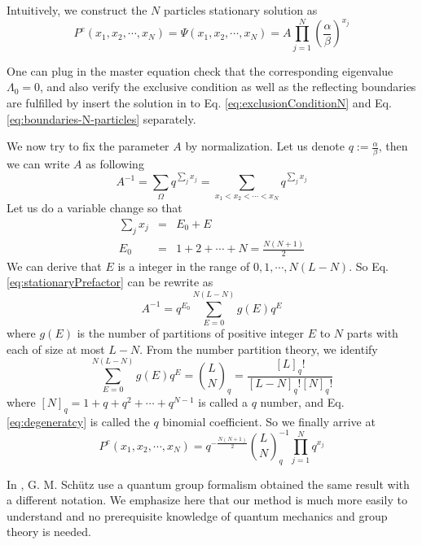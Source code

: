Intuitively, we construct the $N$ particles stationary solution as
\begin{equation}
    \label{eq:stationaryN}
    P^e(x_1, x_2, \cdots, x_N) = \Psi(x_1, x_2, \cdots, x_N) =  A
    \prod_{j=1}^N\left(\frac{\alpha}{\beta}\right)^{x_j}
\end{equation}

One can plug in the master equation check that the corresponding eigenvalue
$\Lambda_0= 0$, and also verify the exclusive condition as well as the reflecting
boundaries are fulfilled by insert the solution in to Eq.
\eqref{eq:exclusionConditionN} and Eq. \eqref{eq:boundaries-N-particles}
separately.

We now try to fix the parameter $A$ by normalization. Let us denote
$q:=\frac{\alpha}{\beta}$, then we can write $A$ as following
\begin{equation}
    \label{eq:stationaryPrefactor}
    A^{-1} = \sum_{\Omega} q^{\sum_j{x_j}} = 
    \sum_{x_1 < x_2 < \cdots < x_N} q^{\sum_j{x_j}}
\end{equation}
Let us do a variable change so that 
\begin{align*}
    \sum_j{x_j} &=& E_0 + E \\
    E_0 &=& 1 + 2 + \cdots + N = \frac{N(N+1)}{2}
\end{align*}
We can derive that $E$ is a integer in the range of $0, 1, \cdots, N(L-N)$. So
Eq. \eqref{eq:stationaryPrefactor} can be rewrite as 
\begin{equation}
    \label{eq:prefactorRewrite}
    A^{-1} = q^{E_0}\sum_{E=0}^{N(L-N)}g(E)q^E
\end{equation}
where $g(E)$ is the number of partitions of positive integer $E$ to $N$ parts
with each of size at most $L-N$. From the number partition theory, we identify
\begin{equation}
    \label{eq:degeneratcy}
    \sum_{E=0}^{N(L-N)}g(E)q^E = \binom{L}{N}_q =
    \frac{[L]_q!}{[L-N]_q![N]_q!}
\end{equation}
where $[N]_q = 1 + q + q^2 + \cdots + q^{N-1}$ is called a $q$ number, and Eq.
\eqref{eq:degeneratcy} is called the $q$ binomial coefficient\cite{}.
So we finally arrive at 
\begin{equation}
    \label{eq:stationarySolutionN}
    P^e(x_1, x_2, \cdots, x_N) = q^{-\frac{N(N+1)}{2}}
    \binom{L}{N}_q^{-1}\prod_{j=1}^N{q^{x_j}}
\end{equation}

In \cite{}, G. M. Sch\"{u}tz use a quantum group formalism obtained the same
result with a different notation. We emphasize here that our method is much more
easily to understand and no prerequisite knowledge of quantum mechanics and
group theory is needed.

